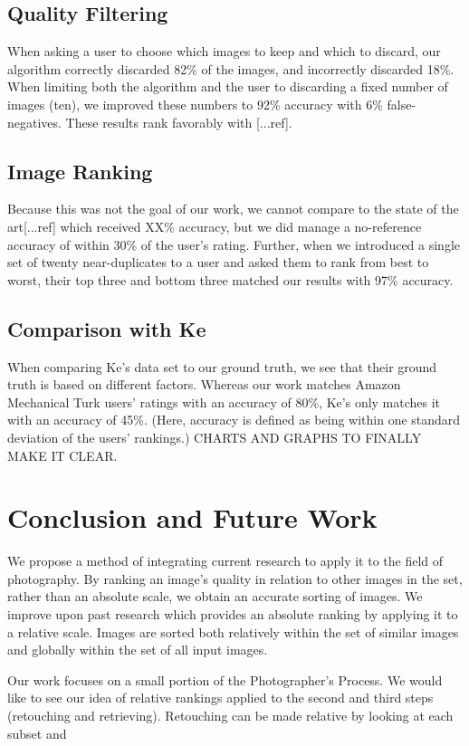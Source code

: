 \documentclass[twocolumn]{article}
\begin{document}
\subsection{Quality Filtering} When asking a user to choose which images to keep and which to discard, our algorithm correctly discarded 82\% of the images, and incorrectly discarded 18\%. When limiting both the algorithm and the user to discarding a fixed number of images (ten), we improved these numbers to 92\% accuracy with 6\% false-negatives. These results rank favorably with [...ref].

\subsection{Image Ranking} Because this was not the goal of our work, we cannot compare to the state of the art[...ref] which received XX\% accuracy, but we did manage a no-reference accuracy of within 30\% of the user's rating. Further, when we introduced a single set of twenty near-duplicates to a user and asked them to rank from best to worst, their top three and bottom three matched our results with 97\% accuracy.

\subsection{Comparison with Ke\cite{1640788}} When comparing Ke's data set to our ground truth, we see that their ground truth is based on different factors. Whereas our work matches Amazon Mechanical Turk users' ratings with an accuracy of 80\%, Ke's only matches it with an accuracy of 45\%. (Here, accuracy is defined as being within one standard deviation of the users' rankings.) CHARTS AND GRAPHS TO FINALLY MAKE IT CLEAR.

\section{Conclusion and Future Work}
We propose a method of integrating current research to apply it to the field of photography. By ranking an image's quality in relation to other images in the set, rather than an absolute scale, we obtain an accurate sorting of images. We improve upon past research which provides an absolute ranking by applying it to a relative scale. Images are sorted both relatively within the set of similar images and globally within the set of all input images.

Our work focuses on a small portion of the Photographer's Process. We would like to see our idea of relative rankings applied to the second and third steps (retouching and retrieving). Retouching can be made relative by looking at each subset and 


\end{document}
